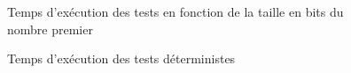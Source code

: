 		\begin{frame}
			\begin{figure}[H]\vspace{-1em}\caption{Temps d'exécution des tests en fonction de la taille en bits du nombre premier}\label{fig:M4}\end{figure}
		\end{frame}
		
		\begin{frame}
			\begin{figure}[H]\vspace{-1em}\caption{Temps d'exécution des tests déterministes}\label{fig:M5}\end{figure}
		\end{frame}		
		
